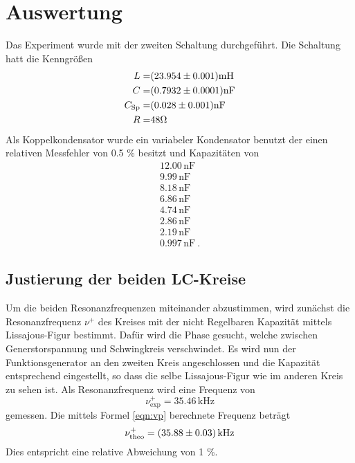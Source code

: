 \section{Auswertung}
\label{sec:Auswertung}
Das Experiment wurde mit der zweiten Schaltung durchgeführt. Die Schaltung hatt die Kenngrößen
\begin{eqnarray}
  L =& (\num{23.954 +- 0.001}) \text{mH}	\\
  C =& (\num{0.7932 +- 0.0001}) \text{nF}	\\
  C_\text{Sp} =& (\num{0.028 +- 0.001})	\text{nF}\\
  R =& 48 \Omega
\end{eqnarray}
Als Koppelkondensator wurde ein variabeler Kondensator benutzt der einen relativen Messfehler von 0.5 \% besitzt und Kapazitäten von 
\begin{eqnarray}
  12.00  \, \text{nF} \\
  9.99 \, \text{nF} \\
  8.18 \, \text{nF} \\
  6.86 \, \text{nF} \\
  4.74 \, \text{nF} \\
  2.86 \, \text{nF} \\
  2.19 \, \text{nF} \\
  0.997 \, \text{nF} \ .
\end{eqnarray}

\subsection{Justierung der beiden LC-Kreise}
Um die beiden Resonanzfrequenzen miteinander abzustimmen, wird zunächst die Resonanzfrequenz $\nu^+$ des Kreises mit der nicht Regelbaren Kapazität mittels Lissajous-Figur bestimmt. Dafür wird die Phase gesucht, welche zwischen Generstorspannung und Schwingkreis verschwindet. Es wird nun der Funktionsgenerator an den zweiten Kreis angeschlossen und die Kapazität entsprechend eingestellt, so dass die selbe Lissajous-Figur wie im anderen Kreis zu sehen ist.
Als Resonanzfrequenz wird eine Frequenz von
\begin{equation}
  \nu_\text{exp}^+ = 35.46 \, \text{kHz}
  \label{nu+}
\end{equation}
gemessen. Die mittels Formel \ref{eqn:vp} berechnete Frequenz beträgt
\begin{equation}
  \nu_\text{theo}^+ = (\num{35.88 +- 0.03}) \, \text{kHz}
  \label{eqn_nut+}
\end{equation}
Dies entspricht eine relative Abweichung von 1 \%.
